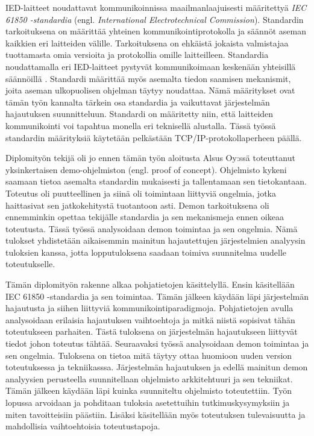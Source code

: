 IED-laitteet noudattavat kommunikoinnissa maailmanlaajuisesti määritettyä \emph{IEC 61850 -standardia} (engl. \emph{International Electrotechnical Commission}). Standardin tarkoituksena on määrittää yhteinen kommunikointiprotokolla ja säännöt aseman kaikkien eri laitteiden välille. Tarkoituksena on ehkäistä jokaista valmistajaa tuottamasta omia versioita ja protokollia omille laitteilleen. Standardia noudattamalla eri IED-laitteet pystyvät kommunikoimaan keskenään yhteisillä säännöillä \cite[s.~624]{Mackiewicz2006}. Standardi määrittää myös asemalta tiedon saamisen mekanismit, joita aseman ulkopuolisen ohjelman täytyy noudattaa. Nämä määritykset ovat tämän työn kannalta tärkein osa standardia ja vaikuttavat järjestelmän hajautuksen suunnitteluun. Standardi on määritetty niin, että laitteiden kommunikointi voi tapahtua monella eri teknisellä alustalla. Tässä työssä standardin määrityksiä käytetään pelkästään TCP/IP-protokollaperheen päällä.

Diplomityön tekijä oli jo ennen tämän työn aloitusta Alsus Oy:ssä toteuttanut yksinkertaisen demo-ohjelmiston (engl. proof of concept). Ohjelmisto kykeni saamaan tietoa asemalta standardin mukaisesti ja tallentamaan sen tietokantaan. Toteutus oli puutteellinen ja siinä oli toimintaan liittyviä ongelmia, jotka haittasivat sen jatkokehitystä tuotantoon asti. Demon tarkoituksena oli ennemminkin opettaa tekijälle standardia ja sen mekanismeja ennen oikeaa toteutusta. Tässä työssä analysoidaan demon toimintaa ja sen ongelmia. Nämä tulokset yhdistetään aikaisemmin mainitun hajautettujen järjestelmien analyysin tuloksien kanssa, jotta lopputuloksena saadaan toimiva suunnitelma uudelle toteutukselle.

Tämän diplomityön rakenne alkaa pohjatietojen käsittelyllä. Ensin käsitellään IEC 61850 -standardia ja sen toimintaa. Tämän jälkeen käydään läpi järjestelmän hajautusta ja siihen liittyviä kommunikointiparadigmoja. Pohjatietojen avulla analysoidaan erilaisia hajautuksen vaihtoehtoja ja mitkä niistä sopisivat tähän toteutukseen parhaiten. Tästä tuloksena on järjestelmän hajautukseen liittyvät tiedot johon toteutus tähtää. Seuraavaksi työssä analysoidaan demon toimintaa ja sen ongelmia. Tuloksena on tietoa mitä täytyy ottaa huomioon uuden version toteutuksessa ja tekniikasssa. Järjestelmän hajautuksen ja edellä mainitun demon analyysien perusteella suunnitellaan ohjelmisto arkkitehtuuri ja sen tekniikat. Tämän jälkeen käydään läpi kuinka suunniteltu ohjelmisto toteutettiin. Työn lopussa arvoidaan ja pohditaan tuloksia asetettuihin tutkimuskysymyksiin ja miten tavoitteisiin päästiin. Lisäksi käsitellään myös toteutuksen tulevaisuutta ja mahdollisia vaihtoehtoisia toteutustapoja.


